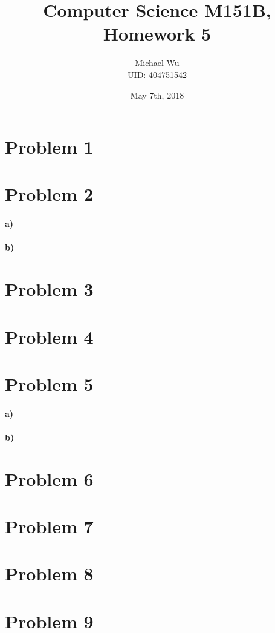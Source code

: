 \documentclass[12pt]{article}
\begin{document}
\title{Computer Science M151B, Homework 5}
\date{May 7th, 2018}
\author{Michael Wu\\UID: 404751542}
\maketitle

\section*{Problem 1}

\section*{Problem 2}

\paragraph{a)}

\paragraph{b)}

\section*{Problem 3}

\section*{Problem 4}

\section*{Problem 5}

\paragraph{a)}

\paragraph{b)}

\section*{Problem 6}

\section*{Problem 7}

\section*{Problem 8}

\section*{Problem 9}
\end{document}
